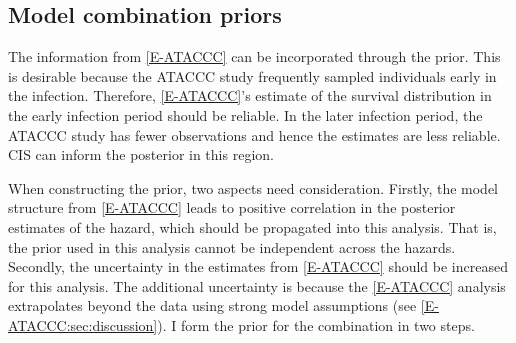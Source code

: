 \documentclass[thesis.tex]{subfiles}
\begin{document}
\subsection{Model combination priors} \label{perf-test:sec:informative-priors}

The information from \cref{E-ATACCC} can be incorporated through the prior.
This is desirable because the ATACCC study frequently sampled individuals early in the infection.
Therefore, \cref{E-ATACCC}'s estimate of the survival distribution in the early infection period should be reliable.
In the later infection period, the ATACCC study has fewer observations and hence the estimates are less reliable.
CIS can inform the posterior in this region.

When constructing the prior, two aspects need consideration.
Firstly, the model structure from \cref{E-ATACCC} leads to positive correlation in the posterior estimates of the hazard, which should be propagated into this analysis.
That is, the prior used in this analysis cannot be independent across the hazards.
Secondly, the uncertainty in the estimates from \cref{E-ATACCC} should be increased for this analysis.
The additional uncertainty is because the \cref{E-ATACCC} analysis extrapolates beyond the data using strong model assumptions (see \cref{E-ATACCC:sec:discussion}).
I form the prior for the combination in two steps.
\end{document}
